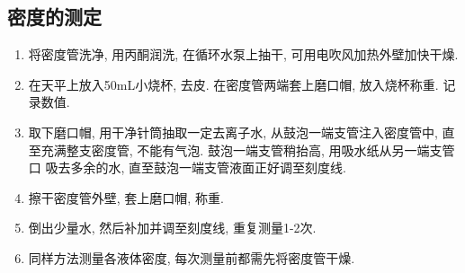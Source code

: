\documentclass[a4paper]{article}
\begin{document}
\subsection{密度的测定}
\begin{enumerate}
	\item 将密度管洗净, 用丙酮润洗, 在循环水泵上抽干, 可用电吹风加热外壁加快干燥.
	\item 在天平上放入50mL小烧杯, 去皮. 在密度管两端套上磨口帽, 放入烧杯称重.
	记录数值.
	\item 取下磨口帽, 用干净针筒抽取一定去离子水, 从鼓泡一端支管注入密度管中, 
	直至充满整支密度管, 不能有气泡. 鼓泡一端支管稍抬高, 用吸水纸从另一端支管口
	吸去多余的水, 直至鼓泡一端支管液面正好调至刻度线.
	\item 擦干密度管外壁, 套上磨口帽, 称重.
	\item 倒出少量水, 然后补加并调至刻度线, 重复测量1-2次.
	\item 同样方法测量各液体密度, 每次测量前都需先将密度管干燥.
\end{enumerate}


\newpage
\end{document}
